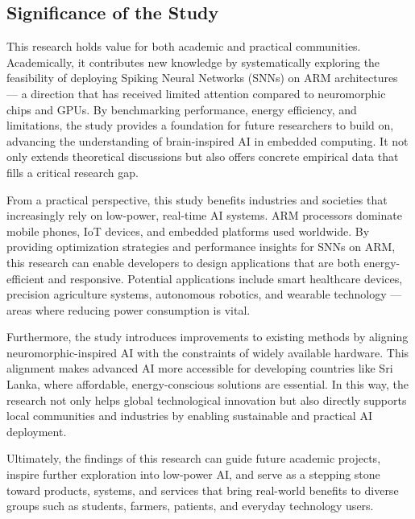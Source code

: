 \documentclass[a4paper,12pt]{article}
\begin{document}
	\subsection{Significance of the Study}
	This research holds value for both academic and practical communities. Academically, it contributes new knowledge by systematically exploring the feasibility of deploying Spiking Neural Networks (SNNs) on ARM architectures — a direction that has received limited attention compared to neuromorphic chips and GPUs. By benchmarking performance, energy efficiency, and limitations, the study provides a foundation for future researchers to build on, advancing the understanding of brain-inspired AI in embedded computing. It not only extends theoretical discussions but also offers concrete empirical data that fills a critical research gap.
	
	From a practical perspective, this study benefits industries and societies that increasingly rely on low-power, real-time AI systems. ARM processors dominate mobile phones, IoT devices, and embedded platforms used worldwide. By providing optimization strategies and performance insights for SNNs on ARM, this research can enable developers to design applications that are both energy-efficient and responsive. Potential applications include smart healthcare devices, precision agriculture systems, autonomous robotics, and wearable technology — areas where reducing power consumption is vital.
	
	Furthermore, the study introduces improvements to existing methods by aligning neuromorphic-inspired AI with the constraints of widely available hardware. This alignment makes advanced AI more accessible for developing countries like Sri Lanka, where affordable, energy-conscious solutions are essential. In this way, the research not only helps global technological innovation but also directly supports local communities and industries by enabling sustainable and practical AI deployment.
	
	Ultimately, the findings of this research can guide future academic projects, inspire further exploration into low-power AI, and serve as a stepping stone toward products, systems, and services that bring real-world benefits to diverse groups such as students, farmers, patients, and everyday technology users.
	
\end{document}
